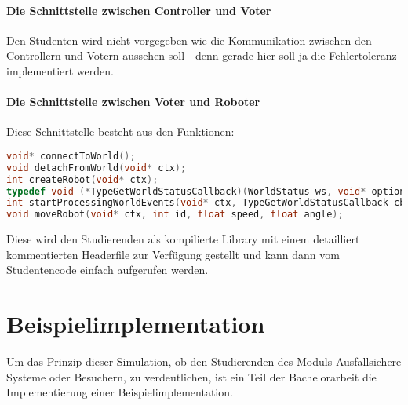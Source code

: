\paragraph{Die Schnittstelle zwischen Controller und Voter} Den Studenten wird nicht vorgegeben wie die Kommunikation zwischen den Controllern und Votern aussehen soll - denn gerade hier soll ja die Fehlertoleranz implementiert werden.

\paragraph{Die Schnittstelle zwischen Voter und Roboter} Diese Schnittstelle besteht aus den Funktionen:
\begin{lstlisting}[frame=single, language=c] 
void* connectToWorld();
void detachFromWorld(void* ctx);
int createRobot(void* ctx);
typedef void (*TypeGetWorldStatusCallback)(WorldStatus ws, void* optional);
int startProcessingWorldEvents(void* ctx, TypeGetWorldStatusCallback cb, void* optional);
void moveRobot(void* ctx, int id, float speed, float angle);
\end{lstlisting}

Diese wird den Studierenden als kompilierte Library mit einem detailliert kommentierten Headerfile zur Verf{\"{u}}gung gestellt und kann
dann vom Studentencode einfach aufgerufen werden.


\clearpage
\section{Beispielimplementation}
Um das Prinzip dieser Simulation, ob den Studierenden des Moduls Ausfallsichere Systeme oder Besuchern, zu verdeutlichen, ist ein Teil der Bachelorarbeit die Implementierung einer
Beispielimplementation.

